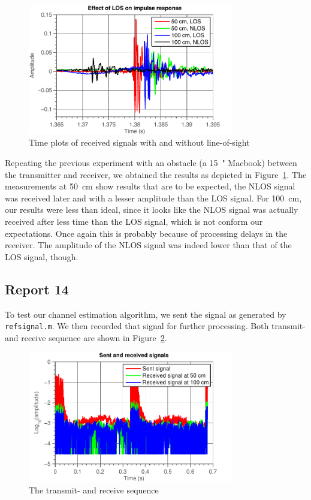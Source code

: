 \documentclass[11pt,titlepage]{report}
\begin{document}
\begin{figure}[H]
	\centering
	\includegraphics[width=0.8\textwidth]{../../deliverable-7-resources/figures/ass-1/report-11-12-13/ass-1-report-13-los-nlos.pdf}
	\caption{Time plots of received signals with and without line-of-sight}
	\label{fig:rep13-nlos}
\end{figure}

Repeating the previous experiment with an obstacle (a \SI{15}{"} Macbook) between the transmitter and receiver, we obtained the results as depicted in Figure~\ref{fig:rep13-nlos}. The measurements at \SI{50}{cm} show results that are to be expected, the NLOS signal was received later and with a lesser amplitude than the LOS signal. For \SI{100}{cm}, our results were less than ideal, since it looks like the NLOS signal was actually received after less time than the LOS signal, which is not conform our expectations. Once again this is probably because of processing delays in the receiver. The amplitude of the NLOS signal was indeed lower than that of the LOS signal, though.


\subsection{Report 14}
To test our channel estimation algorithm, we sent the signal as generated by \texttt{refsignal.m}. We then recorded that signal for further processing. Both transmit- and receive sequence are shown in Figure~\ref{fig:rep14-tx-rx}.

\begin{figure}[H]
	\centering
	\includegraphics[width=0.8\textwidth]{../../deliverable-7-resources/figures/ass-1/report-14-15/ass-1-report-14-sent-received.pdf}
	\caption{The transmit- and receive sequence}
	\label{fig:rep14-tx-rx}
\end{figure}
\end{document}
